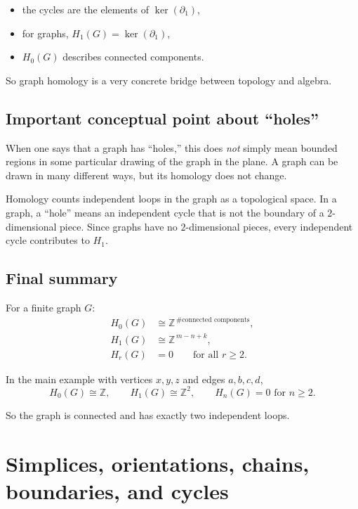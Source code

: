 \documentclass[12pt,a4paper]{article}
\theoremstyle{notespace}
\begin{document}
	\begin{itemize}[leftmargin=2em]
		\item the cycles are the elements of \(\ker(\partial_1)\),
		\item for graphs, \(H_1(G)=\ker(\partial_1)\),
		\item \(H_0(G)\) describes connected components.
	\end{itemize}
	
	So graph homology is a very concrete bridge between topology and algebra.
	
	\subsection{Important conceptual point about ``holes''}
	
	When one says that a graph has ``holes,'' this does \emph{not} simply mean bounded regions in some particular drawing of the graph in the plane. A graph can be drawn in many different ways, but its homology does not change.
	
	Homology counts independent loops in the graph as a topological space. In a graph, a ``hole'' means an independent cycle that is not the boundary of a \(2\)-dimensional piece. Since graphs have no \(2\)-dimensional pieces, every independent cycle contributes to \(H_1\).
	
	\subsection{Final summary}
	
	For a finite graph \(G\):
	\begin{align*}
		H_0(G) &\cong \mathbb{Z}^{\,\#\text{connected components}},\\[4pt]
		H_1(G) &\cong \mathbb{Z}^{\,m-n+k},\\[4pt]
		H_r(G) &=0 \qquad \text{for all } r\ge 2.
	\end{align*}
	
	In the main example with vertices \(x,y,z\) and edges \(a,b,c,d\),
	\[
	H_0(G)\cong \mathbb{Z},
	\qquad
	H_1(G)\cong \mathbb{Z}^2,
	\qquad
	H_n(G)=0 \text{ for } n\ge 2.
	\]
	
	So the graph is connected and has exactly two independent loops.


\section{Simplices, orientations, chains, boundaries, and cycles}
\end{document}
